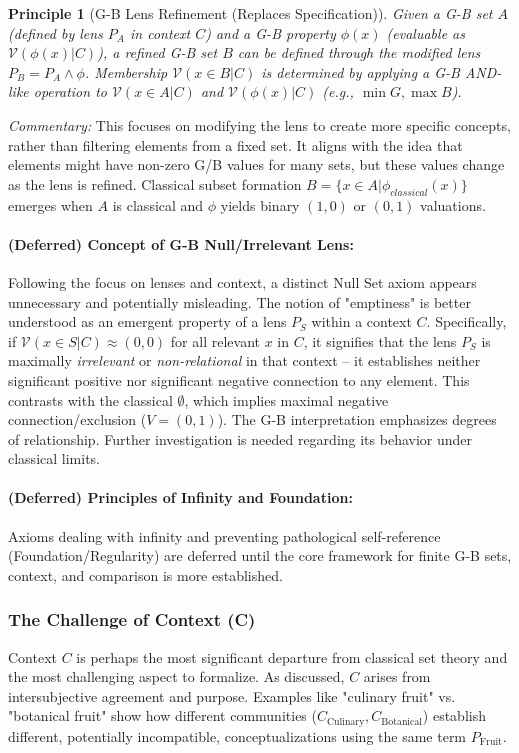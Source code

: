\documentclass[11pt]{article}
\newcommand{\gbval}[1]{\mathcal{V}(#1)}         %
\newcommand{\pset}[1]{P_{#1}}                   %
\theoremstyle{definition}
\theoremstyle{plain}
\newtheorem{principle}{Principle}[section] %
\begin{document}
\begin{principle}[G-B Lens Refinement (Replaces Specification)]
Given a G-B set $A$ (defined by lens $\pset{A}$ in context $C$) and a G-B property $\phi(x)$ (evaluable as $\gbval{\phi(x)|C}$), a refined G-B set $B$ can be defined through the modified lens $\pset{B} = \pset{A} \land \phi$. Membership $\gbval{x \in B | C}$ is determined by applying a G-B AND-like operation to $\gbval{x \in A | C}$ and $\gbval{\phi(x)|C}$ (e.g., $\min G, \max B$).
\end{principle}
\textit{Commentary:} This focuses on modifying the lens to create more specific concepts, rather than filtering elements from a fixed set. It aligns with the idea that elements might have non-zero G/B values for many sets, but these values change as the lens is refined. Classical subset formation $B = \{x \in A | \phi_{classical}(x)\}$ emerges when $A$ is classical and $\phi$ yields binary $(1,0)$ or $(0,1)$ valuations.

\paragraph{(Deferred) Concept of G-B Null/Irrelevant Lens:}
Following the focus on lenses and context, a distinct Null Set axiom appears unnecessary and potentially misleading. The notion of "emptiness" is better understood as an emergent property of a lens $\pset{S}$ within a context $C$. Specifically, if $\gbval{x \in S | C} \approx (0, 0)$ for all relevant $x$ in $C$, it signifies that the lens $\pset{S}$ is maximally \textit{irrelevant} or \textit{non-relational} in that context – it establishes neither significant positive nor significant negative connection to any element. This contrasts with the classical $\emptyset$, which implies maximal negative connection/exclusion ($V=(0,1)$). The G-B interpretation emphasizes degrees of relationship. Further investigation is needed regarding its behavior under classical limits.

\paragraph{(Deferred) Principles of Infinity and Foundation:}
Axioms dealing with infinity and preventing pathological self-reference (Foundation/Regularity) are deferred until the core framework for finite G-B sets, context, and comparison is more established.

\subsubsection{The Challenge of Context (C)} \label{sec:context_challenge}
Context $C$ is perhaps the most significant departure from classical set theory and the most challenging aspect to formalize. As discussed, $C$ arises from intersubjective agreement and purpose. Examples like "culinary fruit" vs. "botanical fruit" show how different communities ($C_{\text{Culinary}}, C_{\text{Botanical}}$) establish different, potentially incompatible, conceptualizations using the same term $\pset{\text{Fruit}}$.
\end{document}
